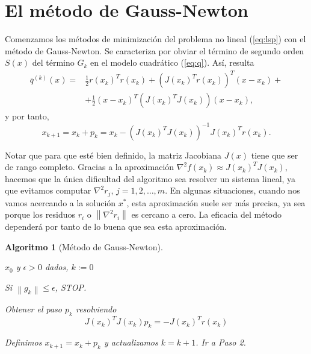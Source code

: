 \documentclass[11pt,a4paper]{book}
\newtheorem{algorithm}[theorem]{Algoritmo}
\theoremstyle{definition}
\theoremstyle{remark}
\newcommand{\norm}[1]{\left\lVert#1\right\rVert}
\begin{document}
\section{El método de Gauss-Newton}

Comenzamos los métodos de minimización del problema no lineal (\ref{eq:lsp}) con el método de Gauss-Newton. Se caracteriza por obviar el término de segundo orden $S(x)$ del término $G_k$ en el modelo cuadrático (\ref{eq:q}). Así, resulta
\begin{equation}
\begin{split}
\bar q^{(k)}(x) =& \frac{1}{2}r(x_k)^Tr(x_k)+(J(x_k)^Tr(x_k))^T(x-x_k)+ \\
	& +\frac{1}{2}(x-x_k)^T(J(x_k)^TJ(x_k))(x-x_k),
\end{split}
\end{equation}
y por tanto,
\begin{equation}
	x_{k+1} = x_k + p_k = x_k -(J(x_k)^TJ(x_k))^{-1}J(x_k)^Tr(x_k).
\end{equation}

Notar que para que esté bien definido, la matriz Jacobiana $J(x)$ tiene que ser de rango completo. Gracias a la aproximación $\nabla^2 f(x_k) \approx J(x_k)^TJ(x_k)$, hacemos que la única dificultad del algoritmo sea resolver un sistema lineal, ya que evitamos computar $\nabla^2 r_j,\,j=1,2,\ldots ,m$. En algunas situaciones, cuando nos vamos acercando a la solución $x^*$, esta aproximación suele ser más precisa, ya sea porque los residuos $r_i$ o $\norm{\nabla^2 r_i}$ es cercano a cero. La eficacia del método dependerá por tanto de lo buena que sea esta aproximación.

\begin{algorithm}[Método de Gauss-Newton] \leavevmode
\label{al:g-n}
\begin{steps}
	\item $x_0$ y $\epsilon > 0$ dados, $k:=0$
	\item Si $\norm{g_k} \leq \epsilon$, STOP.   
	\item Obtener el paso $p_k$ resolviendo
		\begin{equation}
			J(x_k)^TJ(x_k)p_k = -J(x_k)^Tr(x_k)
		\end{equation}
	\item Definimos $x_{k+1} = x_k + p_k$ y actualizamos $k=k+1$. Ir a Paso 2. \quad \qedsymbol
\end{steps}
\end{algorithm}
\end{document}
